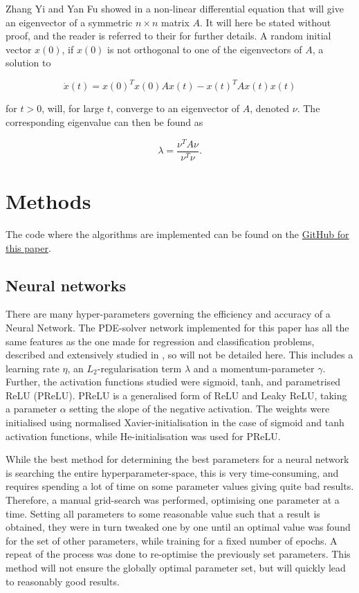 \documentclass[multicolumn, 9pt]{extarticle}
\begin{document}
Zhang Yi and Yan Fu showed in \cite{symmetric} a non-linear differential equation that will give an eigenvector of a symmetric $n\times n$ matrix $A$. It will here be stated without proof, and the reader is referred to their \cite{symmetric} for further details. A random initial vector $x(0)$, if $x(0)$ is not orthogonal to one of the eigenvectors of $A$, a solution to

\begin{equation}\label{eq:diff_sym}
	\dot{x}(t) = x(0)^Tx(0)Ax(t)-x(t)^TAx(t)x(t)
\end{equation}

for $t>0$, will, for large $t$, converge to an eigenvector of $A$, denoted $\nu$. The corresponding eigenvalue can then be found as

\begin{equation}
\label{eq:eigval}
	\lambda = \frac{\nu^TA\nu}{\nu^T\nu}.
\end{equation}


\section{Methods}
The code where the algorithms are implemented can be found on the \href{https://github.com/SaraPJensen/FYS-STK/tree/main/Project3/code}{GitHub for this paper}.

\subsection{Neural networks}
There are many hyper-parameters governing the efficiency and accuracy of a Neural Network. The PDE-solver network implemented for this paper has all the same features as the one made for regression and classification problems, described and extensively studied in \cite{p2HO}, so will not be detailed here. This includes a learning rate $\eta$, an $L_2$-regularisation term $\lambda$ and a momentum-parameter $\gamma$. Further, the activation functions studied were sigmoid, tanh, and parametrised ReLU (PReLU). PReLU is a generalised form of ReLU and Leaky ReLU, taking a parameter $\alpha$ setting the slope of the negative activation. The weights were initialised using normalised Xavier-initialisation in the case of sigmoid and tanh activation functions, while He-initialisation was used for PReLU.

While the best method for determining the best parameters for a neural network is searching the entire hyperparameter-space, this is very time-consuming, and requires spending a lot of time on some parameter values giving quite bad results. Therefore, a manual grid-search was performed, optimising one parameter at a time. Setting all parameters to some reasonable value such that a result is obtained, they were in turn tweaked one by one until an optimal value was found for the set of other parameters, while training for a fixed number of epochs. A repeat of the process was done to re-optimise the previously set parameters. This method will not ensure the globally optimal parameter set, but will quickly lead to reasonably good results.
\end{document}
